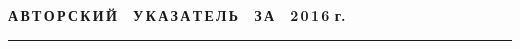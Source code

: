 

\def\stat{cont}
{%
\raggedleft\Large \bf%
А\,В\,Т\,О\,Р\,С\,К\,И\,Й\ \ У\,К\,А\,З\,А\,Т\,Е\,Л\,Ь\ \ З\,А\ \ 2\,0\,1\,6 г. \vskip 17pt
 \hrule
 \par
{} }

\label{st\stat}

\def\tit{\ }

\def\aut{\ }
\def\auf{\ }

\def\leftkol{\ } %

\def\rightkol{\ } %

\titele{\tit}{\aut}{\auf}{\leftkol}{\rightkol}

\vspace*{-12pt}
\vspace*{-36pt}

